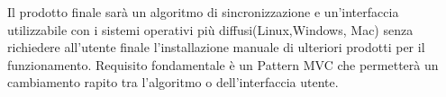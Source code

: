  Il prodotto finale sarà un algoritmo di sincronizzazione e un'interfaccia utilizzabile con i sistemi operativi più diffusi(Linux,Windows, Mac) senza richiedere all'utente finale l'installazione manuale di ulteriori prodotti per il funzionamento. Requisito fondamentale è un Pattern MVC  che permetterà un cambiamento rapito tra l'algoritmo o dell'interfaccia utente.